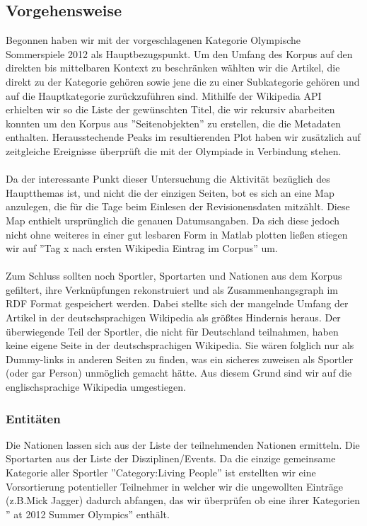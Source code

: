 \documentclass[pagesize=auto, titlepage=on]{scrartcl}
\begin{document}
\subsection{Vorgehensweise}
Begonnen haben wir mit der vorgeschlagenen Kategorie Olympische Sommerspiele 2012 als Hauptbezugspunkt.
Um den Umfang des Korpus auf den direkten bis mittelbaren Kontext zu beschränken wählten wir die Artikel, die direkt zu der Kategorie gehören sowie jene die zu einer Subkategorie gehören und auf die Hauptkategorie zurückzuführen sind.
Mithilfe der Wikipedia API erhielten wir so die Liste der gewünschten Titel, die wir rekursiv abarbeiten konnten um den Korpus aus ''Seitenobjekten'' zu erstellen, die die Metadaten enthalten.
Herausstechende Peaks im resultierenden Plot haben wir zusätzlich auf zeitgleiche Ereignisse überprüft die mit der Olympiade in Verbindung stehen.
\paragraph{}
Da der interessante Punkt dieser Untersuchung die Aktivität bezüglich des Hauptthemas ist, und nicht die der einzigen Seiten, bot es sich an eine Map anzulegen, die für die Tage beim Einlesen der Revisionensdaten mitzählt.
Diese Map enthielt ursprünglich die genauen Datumsangaben. Da sich diese jedoch nicht ohne weiteres in einer gut lesbaren Form in  Matlab plotten ließen stiegen wir auf ''Tag x nach ersten Wikipedia Eintrag im Corpus'' um.
\paragraph{}
Zum Schluss sollten noch Sportler, Sportarten und Nationen aus dem Korpus gefiltert, ihre Verknüpfungen rekonstruiert und als Zusammenhangsgraph im RDF Format gespeichert werden.
Dabei stellte sich der mangelnde Umfang der Artikel in der deutschsprachigen Wikipedia als größtes Hindernis heraus.
Der überwiegende Teil der Sportler, die nicht für Deutschland teilnahmen, haben keine eigene Seite in der deutschsprachigen Wikipedia.
Sie wären folglich nur als Dummy-links in anderen Seiten zu finden, was ein sicheres zuweisen als Sportler (oder gar Person) unmöglich gemacht hätte.
Aus diesem Grund sind wir auf die englischsprachige Wikipedia umgestiegen.
\subsubsection{Entitäten}
Die Nationen lassen sich aus der Liste der teilnehmenden Nationen ermitteln.
Die Sportarten aus der Liste der Disziplinen/Events. 
Da die einzige gemeinsame Kategorie aller Sportler ''Category:Living People'' ist erstellten wir eine Vorsortierung potentieller Teilnehmer in welcher wir die ungewollten Einträge (z.B.Mick Jagger) dadurch abfangen, das wir überprüfen ob eine ihrer Kategorien '' at 2012 Summer Olympics'' enthält.
\end{document}
